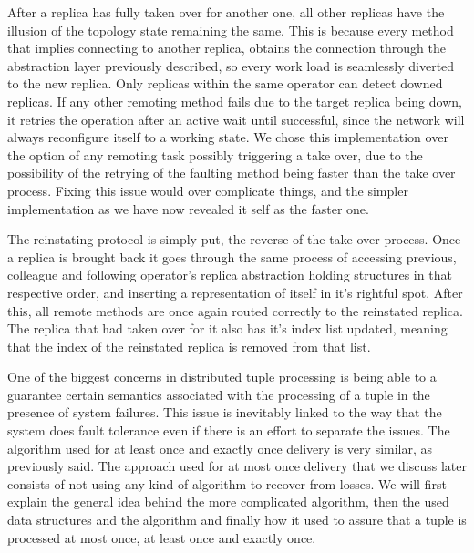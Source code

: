 \documentclass[times, 10pt,twocolumn]{article}
\begin{document}
After a replica has fully taken over for another one, all other replicas
have the illusion of the topology state remaining the same. This is
because every method that implies connecting to another replica, obtains
the connection through the abstraction layer previously described, so
every work load is seamlessly diverted to the new replica.  Only replicas
within the same operator can detect downed replicas. If any other remoting
method fails due to the target replica being down, it retries the operation after an active wait
until successful, since the network will always reconfigure itself to a working state. We chose this implementation over the option of any remoting
task possibly triggering a take over, due to the possibility of the
retrying of the faulting method being faster than the take over process.
Fixing this issue would over complicate things, and the simpler
implementation as we have now revealed it self as the faster one.

The reinstating protocol is simply put, the reverse of the take over
process. Once a replica is brought back it goes through the same process
of accessing previous, colleague and following operator's replica
abstraction holding structures in that respective order, and inserting a
representation of itself in it's rightful spot.  After this, all remote
methods are once again routed correctly to the reinstated replica.  The
replica that had taken over for it also has it's index list updated,
meaning that the index of the reinstated replica is removed from that
list.

One of the biggest concerns in distributed tuple processing is being able
to a guarantee certain semantics associated with the processing of a tuple
in the presence of system failures. This issue is
inevitably linked to the way that the system does fault tolerance even if there is an effort to separate the issues. The
algorithm used for at least once and exactly once delivery is very similar, as previously said. The approach used for at most once delivery that we discuss later consists of not using any kind of algorithm to recover from losses. We will first explain the
general idea behind the more complicated algorithm, then the used data structures and the
algorithm and finally how it used to assure that a tuple is processed at
most once, at least once and exactly once.
\end{document}
